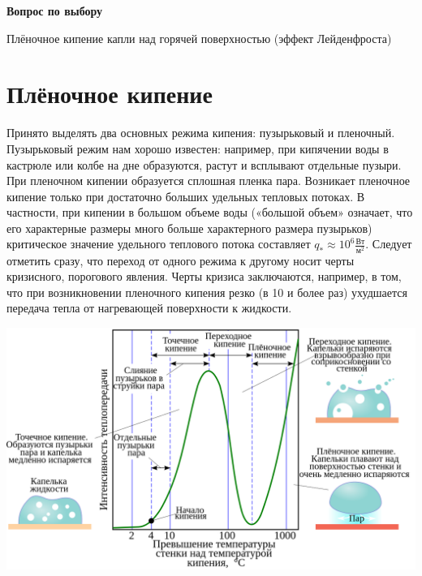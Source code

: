\documentclass[a4paper,12pt]{article} %
\begin{document}
	
	\begin{center}
		{\huge \bf{Вопрос по выбору}}
	\end{center}
	\begin{center}
		{\huge Плёночное кипение капли над горячей поверхностью (эффект Лейденфроста)}
	\end{center}

\section{Плёночное кипение}

\noindent Принято выделять два основных режима кипения: пузырьковый и пленочный. Пузырьковый режим нам хорошо известен: например, при кипячении воды в кастрюле или колбе на дне образуются, растут и всплывают отдельные пузыри. При пленочном кипении образуется сплошная пленка пара. Возникает пленочное кипение только при достаточно больших удельных тепловых потоках. В частности, при кипении в большом объеме воды («большой объем» означает, что его характерные размеры много больше характерного размера пузырьков) критическое значение удельного теплового потока составляет $q_{*} \approx 10^6 \frac{\text{Вт}}{\text{м}^2}$. Следует отметить сразу, что переход от одного режима к другому носит черты кризисного, порогового явления. Черты кризиса заключаются, например, в том, что при возникновении пленочного кипения резко (в 10 и более раз) ухудшается передача тепла от нагревающей поверхности к жидкости.

\medskip
\begin{center}

  \centering
  \includegraphics[scale={0.4}]{кипение.png}


\end{center}
\end{document}
